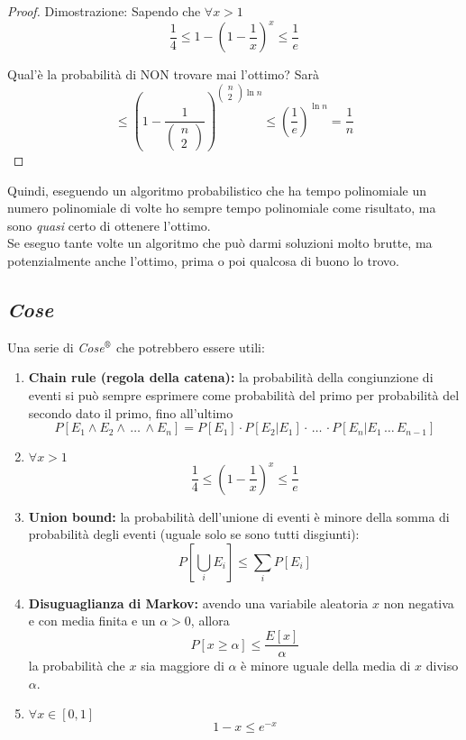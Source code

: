 \begin{proof}
	Dimostrazione: Sapendo che $\forall x >1$
	$$ \frac{1}{4} \leq1 - \left( 1 - \frac{1}{x}\right)^x \leq \frac{1}{e}$$
	
	Qual'è la probabilità di NON trovare mai l'ottimo? Sarà
	$$ \leq \left(1 - \frac{1}{\left(\begin{array}{c} n \\ 2 \end{array}\right)}\right)^{\left(\begin{array}{c} n \\ 2 \end{array}\right) \ln n} 
	\leq \left(\frac{1}{e}\right)^{\ln n} 
	= \frac{1}{n}
	$$
\end{proof}

Quindi, eseguendo un algoritmo probabilistico che ha tempo polinomiale un numero polinomiale di volte ho sempre tempo polinomiale come risultato, ma sono \textit{quasi} certo di ottenere l'ottimo.\\

Se eseguo tante volte un algoritmo che può darmi soluzioni molto brutte, ma potenzialmente anche l'ottimo, prima o poi qualcosa di buono lo trovo.\\


\newpage

\subsection*{\textit{Cose}}

Una serie di \textit{Cose}$^\text{\textregistered}$ che potrebbero essere utili: 

\begin{enumerate}
	\item \textbf{Chain rule (regola della catena):} la probabilità della congiunzione di eventi si può sempre esprimere come probabilità del primo per probabilità del secondo dato il primo, fino all'ultimo
	$$ P[E_1 \wedge E_2 \wedge \, \dots \, \wedge E_n] = P [E_1] \cdot P [E_2 | E_1] \cdot \, \dots \, \cdot P[E_n | E_1 \, \dots \, E_{n-1}] $$
	
	\item $\forall x > 1$
	$$ \frac{1}{4} \leq \left(1 - \frac{1}{x}\right)^x \leq \frac{1}{e} $$
	
	\item \textbf{Union bound:} la probabilità dell'unione di eventi è minore della somma di probabilità degli eventi (uguale solo se sono tutti disgiunti):
	$$ P\left[ \bigcup_i E_i \right] \leq \sum_i P[E_i] $$
	
	\item \textbf{Disuguaglianza di Markov:} avendo una variabile aleatoria $x$ non negativa e con media finita e un $\alpha > 0$, allora
	$$ P[x \geq \alpha] \leq \frac{E[x]}{\alpha} $$
	la probabilità che $x$ sia maggiore di $\alpha$ è minore uguale della media di $x$ diviso $\alpha$.\\
	
	\item $\forall x \in [0,1]$
	$$ 1 - x \leq e^{-x} $$
\end{enumerate}

